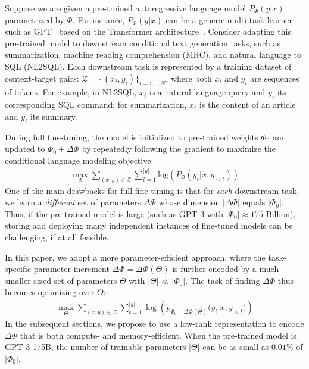 \newcommand{\cZ}{\mathcal{Z}}
Suppose we are given a pre-trained autoregressive language model $P_\Phi(y|x)$ parametrized by $\Phi$.
For instance, $P_\Phi(y|x)$ can be a generic multi-task learner such as GPT~\citep{radford_language_nodate,brown_language_2020} based on the Transformer architecture~\citep{vaswani2017attention}.
Consider adapting this pre-trained model to downstream conditional text generation tasks, such as summarization, machine reading comprehension (MRC), and natural language to SQL (NL2SQL).
Each downstream task is represented by a training dataset of context-target pairs: $\cZ = \{(x_i, y_i)\}_{i=1,..,N}$, where both $x_i$ and $y_i$ are sequences of tokens.
For example, in NL2SQL, $x_i$ is a natural language query and $y_i$ its corresponding SQL command; for summarization, $x_i$ is the content of an article and $y_i$ its summary.

During full fine-tuning, the model is initialized to pre-trained weights $\Phi_0$ and updated to $\Phi_0+\Delta \Phi$ by repeatedly following the gradient to maximize the conditional language modeling objective:
\begin{align}
    \max_{\Phi} \sum_{(x,y)\in\cZ} \sum_{t=1}^{|y|}  \text{log} \left(  P_{\Phi}(y_{t} | x, y_{<t}) \right)
\label{eq:ft_obj}
\end{align}
One of the main drawbacks for full fine-tuning is that for \emph{each} downstream task, we learn a \emph{different} set of parameters $\Delta\Phi$ whose dimension $|\Delta\Phi|$ equals $|\Phi_0|$. 
Thus, if the pre-trained model is large (such as GPT-3 with $|\Phi_0|\approx175 \text{~Billion}$), storing and deploying many independent instances of fine-tuned models can be challenging, if at all feasible. 

In this paper, we adopt a more parameter-efficient approach, where the task-specific parameter increment $\Delta\Phi = \Delta\Phi(\Theta)$ is further encoded by a much smaller-sized set of parameters $\Theta$ with $|\Theta| \ll |\Phi_0|$.
The task of finding $\Delta\Phi$ thus becomes optimizing over $\Theta$:
\begin{align}
    \max_{\Theta} \sum_{(x,y)\in\cZ}  \sum_{t=1}^{|y|}  \log\left({p_{\Phi_0+\Delta\Phi(\Theta)}(y_{t} | x, y_{<t}})\right)
\label{eq:ft_add}
\end{align}
In the subsequent sections, we propose to use a low-rank representation to encode $\Delta\Phi$ that is both compute- and memory-efficient.
When the pre-trained model is GPT-3 175B, the number of trainable parameters $|\Theta|$ can be as small as $0.01\%$ of $|\Phi_0|$. %







